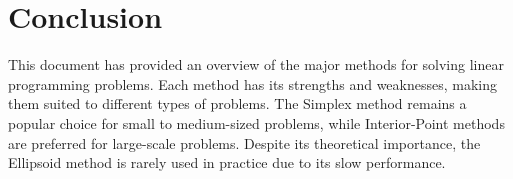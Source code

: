 \documentclass{article}
\begin{document}
\section{Conclusion}
This document has provided an overview of the major methods for solving linear programming problems. Each method has its strengths and weaknesses, making them suited to different types of problems. The Simplex method remains a popular choice for small to medium-sized problems, while Interior-Point methods are preferred for large-scale problems. Despite its theoretical importance, the Ellipsoid method is rarely used in practice due to its slow performance.
\end{document}
